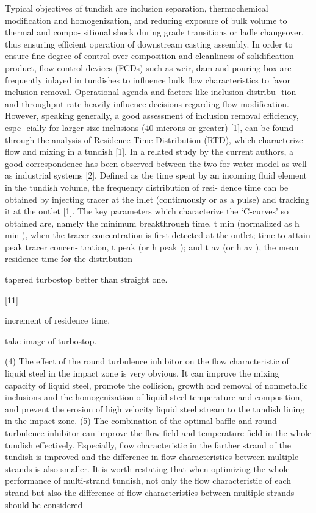 Typical objectives of tundish are inclusion separation,
thermochemical modification and homogenization, and
reducing exposure of bulk volume to thermal and compo-
sitional shock during grade transitions or ladle changeover,
thus ensuring efficient operation of downstream casting
assembly. In order to ensure fine degree of control over
composition and cleanliness of solidification product, flow
control devices (FCDs) such as weir, dam and pouring box
are frequently inlayed in tundishes to influence bulk flow
characteristics to favor inclusion removal.
Operational agenda and factors like inclusion distribu-
tion and throughput rate heavily influence decisions
regarding flow modification. However, speaking generally,
a good assessment of inclusion removal efficiency, espe-
cially for larger size inclusions (40 microns or greater) [1],
can be found through the analysis of Residence Time
Distribution (RTD), which characterize flow and mixing in
a tundish [1]. In a related study by the current authors, a
good correspondence has been observed between the two
for water model as well as industrial systems [2].
Defined as the time spent by an incoming fluid element
in the tundish volume, the frequency distribution of resi-
dence time can be obtained by injecting tracer at the inlet
(continuously or as a pulse) and tracking it at the outlet [1].
The key parameters which characterize the ‘C-curves’ so
obtained are, namely the minimum breakthrough time, t min
(normalized as h min ), when the tracer concentration is first
detected at the outlet; time to attain peak tracer concen-
tration, t peak (or h peak ); and t av (or h av ), the mean residence
time for the distribution

tapered turbostop better than straight one.

[11]

increment of residence time. 

take image of turbostop.

(4) The effect of the round turbulence inhibitor on the flow
characteristic of liquid steel in the impact zone is very obvious.
It can improve the mixing capacity of liquid steel, promote the
collision, growth and removal of nonmetallic inclusions and the
homogenization of liquid steel temperature and composition,
and prevent the erosion of high velocity liquid steel stream to
the tundish lining in the impact zone.
(5) The combination of the optimal baffle and round
turbulence inhibitor can improve the flow field and temperature
field in the whole tundish effectively. Especially, flow
characteristic in the farther strand of the tundish is improved and
the difference in flow characteristics between multiple strands
is also smaller. It is worth restating that when optimizing the
whole performance of multi-strand tundish, not only the flow
characteristic of each strand but also the difference of flow
characteristics between multiple strands should be considered

